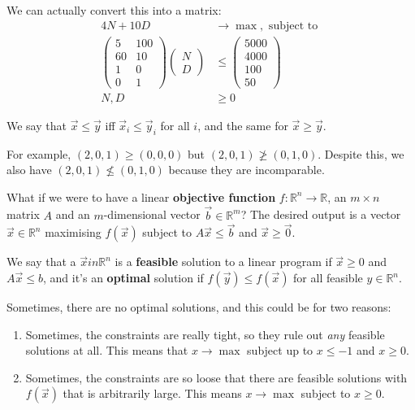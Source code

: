 \documentclass[11pt,a4paper,titlepage,dvipsnames,cmyk]{scrartcl}
\begin{document}
We can actually convert this into a matrix:
\begin{align*}
    4N + 10D &\rightarrow \max, \text{ subject to } \\
\begin{pmatrix}
    5 & 100 \\
    60 & 10 \\
    1 & 0 \\
    0 & 1
\end{pmatrix}
\begin{pmatrix}
    N \\
    D
\end{pmatrix}
&\le
\begin{pmatrix}
    5000 \\
    4000 \\
    100 \\
    50
\end{pmatrix}
\\
N, D &\ge 0
\end{align*}

We say that $\vec x \le \vec y$ iff $\vec x_i \le \vec y_i$ for all $i$,
and the same for $\vec x \ge \vec y$.

For example, $(2,0,1) \ge (0,0,0)$ but $(2,0,1) \not \ge (0,1,0)$. Despite
this, we also have $(2,0,1) \not \le (0,1,0)$ because they are
incomparable.

What if we were to have a linear \textbf{objective function}
$f:\mathbb{R}^n \rightarrow \mathbb{R}$, an  $m \times n$ matrix $A$ and
an $m$-dimensional vector $\vec b \in \mathbb{R}^m$? The desired output is
a vector $\vec x \in \mathbb{R}^n$ maximising $f(\vec x)$ subject to $A
\vec x \le \vec b$ and $\vec x \ge \vec 0$.

We say that a $\vec x in \mathbb{R}^n$ is a \textbf{feasible} solution to
a linear program if $\vec x \ge 0$ and $A \vec x \le b$, and it's an
\textbf{optimal} solution if $f(\vec y) \le f(\vec x)$ for all feasible $y
\in \mathbb{R}^n$.

Sometimes, there are no optimal solutions, and this could be for two
reasons:

\begin{enumerate}
    \item Sometimes, the constraints are really tight, so they rule out
        \textit{any} feasible solutions at all. This means that $x
        \rightarrow \max$ subject up to $x \le -1$ and $x \ge 0$.
    \item Sometimes, the constraints are so loose that there are feasible
        solutions with $f(\vec x)$ that is arbitrarily large. This means
        $x \rightarrow \max$ subject to $x \ge 0$.
\end{enumerate}
\end{document}
